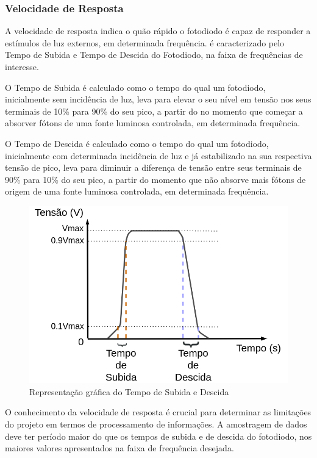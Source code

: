 \subsubsection{Velocidade de Resposta}
A velocidade de resposta indica o quão rápido o fotodiodo \'e capaz de responder a estímulos de luz externos, em determinada frequência. \'e caracterizado pelo Tempo de Subida e Tempo de Descida do Fotodiodo, na faixa de frequências de interesse.

O Tempo de Subida \'e calculado como o tempo do qual um fotodiodo, inicialmente sem incidência de luz, leva para elevar o seu nível em tensão nos seus terminais de 10\% para 90\% do seu pico, a partir do no momento que começar a absorver fótons de uma fonte luminosa controlada, em determinada frequência.

O Tempo de Descida \'e calculado como o tempo do qual um fotodiodo, inicialmente com determinada incidência de luz e já estabilizado na sua respectiva tensão de pico, leva para diminuir a diferença de tensão entre seus terminais de 90\% para 10\% do seu pico, a partir do momento que não absorve mais fótons de origem de uma fonte luminosa controlada, em determinada frequência.

\begin{figure}[!h]
	\caption{\label{fig_velocidadeResp}Representação gr\'afica do Tempo de Subida e Descida}
	\begin{center}
	    \includegraphics[scale=0.3]{Imagens/GraficoVelocidadeResposta.png}
	\end{center}
\end{figure}

O conhecimento da velocidade de resposta \'e crucial para determinar as limitações do projeto em termos de processamento de informações. A amostragem de dados deve ter período maior do que os tempos de subida e de descida do fotodiodo, nos maiores valores apresentados na faixa de frequência desejada.

